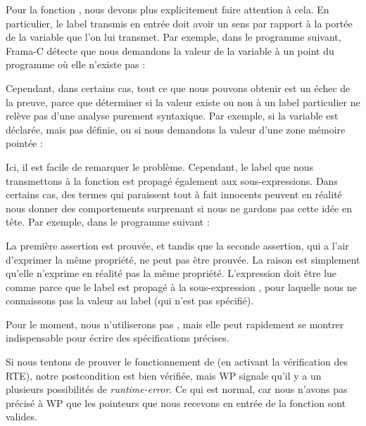 

Pour la fonction , nous devons plus
explicitement faire attention à cela. En particulier, le label transmis en entrée
doit avoir un sens par rapport à la portée de la variable que l'on lui transmet.
Par exemple, dans le programme suivant, Frama-C détecte que nous demandons la valeur
de la variable  à un point du programme où elle n'existe pas :






Cependant, dans certains cas, tout ce que nous pouvons obtenir est un échec de
la preuve, parce que déterminer si la valeur existe ou non à un label particulier
ne relève pas d'une analyse purement syntaxique. Par exemple, si la variable
est déclarée, mais pas définie, ou si nous demandons la valeur d'une zone mémoire
pointée :




Ici, il est facile de remarquer le problème. Cependant, le label que nous
transmettons à la fonction  est propagé également
aux sous-expressions. Dans certains cas, des termes qui paraissent tout à fait
innocents peuvent en réalité nous donner des comportements surprenant si nous
ne gardons pas cette idée en tête. Par exemple, dans le programme suivant :




La première assertion est prouvée, et tandis que la seconde assertion, qui a l'air
d'exprimer la même propriété, ne peut pas être prouvée. La raison est
simplement qu'elle n'exprime en réalité pas la même propriété. L'expression
 doit être lue comme
 parce que le
label est propagé à la sous-expression , pour laquelle nous ne
connaissons pas la valeur au label  (qui n'est pas spécifié).


Pour le moment, nous n'utiliserons pas , mais
elle peut rapidement se montrer indispensable pour écrire des spécifications
précises.





Si nous tentons de prouver le fonctionnement de  (en activant
la vérification des RTE), notre postcondition est bien vérifiée, mais WP
signale qu'il y a un plusieurs possibilités de \textit{runtime-error}. Ce qui
est normal, car nous n'avons pas précisé à WP que les pointeurs que nous
recevons en entrée de la fonction sont valides.



